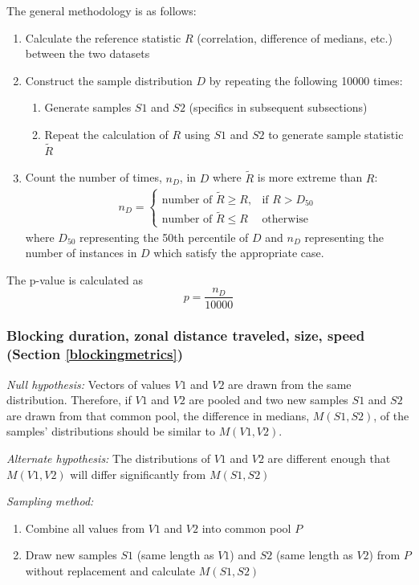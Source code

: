 \documentclass[smallextended]{svjour3}       %
\numberwithin{equation}{section}
\begin{document}
\begin{appendices}
The general methodology is as follows:
\begin{enumerate}
    \item Calculate the reference statistic $R$ (correlation, difference of medians, etc.) between the two datasets
    \item Construct the sample distribution $D$ by repeating the following 10000 times:
    \begin{enumerate}
        \item Generate samples $S1$ and $S2$ (specifics in subsequent subsections)
        \item Repeat the calculation of $R$ using $S1$ and $S2$ to generate sample statistic $\widetilde{R}$
    \end{enumerate}
    \item Count the number of times, $n_D$, in $D$ where $\widetilde{R}$ is more extreme than $R$: \begin{eqnarray}
n_D =  
\begin{cases}
    \text{number of } \widetilde{R}\geq R,& \text{if } R>D_{50}\\
     \text{number of }\widetilde{R}\leq R             & \text{otherwise}
\end{cases}
\end{eqnarray}
where $D_{50}$ representing the 50th percentile of $D$ and $n_D$ representing the number of instances in $D$ which satisfy the appropriate case. 
\end{enumerate}

The p-value is calculated as \begin{equation}
    p=\frac{n_D}{10000}
\end{equation}

\subsubsection{Blocking duration, zonal distance traveled, size, speed (Section \ref{blockingmetrics})}
\textit{Null hypothesis:} Vectors of values $V1$ and $V2$ are drawn from the same distribution. Therefore, if $V1$ and $V2$ are pooled and two new samples $S1$ and $S2$ are drawn from that common pool, the difference in medians, $M(S1,S2)$, of the samples' distributions should be similar to $M(V1,V2)$.

\noindent\textit{Alternate hypothesis:} The distributions of $V1$ and $V2$ are different enough that $M(V1,V2)$ will differ significantly from $M(S1,S2)$

\noindent\textit{Sampling method:}
\begin{enumerate}
     \item Combine all values from $V1$ and $V2$ into common pool $P$
    \item Draw new samples $S1$ (same length as $V1$) and $S2$ (same length as $V2$) from $P$ without replacement and calculate $M(S1,S2)$
\end{enumerate}



\end{appendices}
\end{document}

